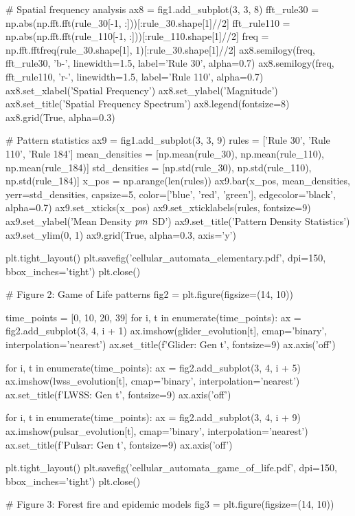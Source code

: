 \documentclass[a4paper, 11pt]{article}
\begin{document}
\begin{pycode}
# Spatial frequency analysis
ax8 = fig1.add_subplot(3, 3, 8)
fft_rule30 = np.abs(np.fft.fft(rule_30[-1, :]))[:rule_30.shape[1]//2]
fft_rule110 = np.abs(np.fft.fft(rule_110[-1, :]))[:rule_110.shape[1]//2]
freq = np.fft.fftfreq(rule_30.shape[1], 1)[:rule_30.shape[1]//2]
ax8.semilogy(freq, fft_rule30, 'b-', linewidth=1.5, label='Rule 30', alpha=0.7)
ax8.semilogy(freq, fft_rule110, 'r-', linewidth=1.5, label='Rule 110', alpha=0.7)
ax8.set_xlabel('Spatial Frequency')
ax8.set_ylabel('Magnitude')
ax8.set_title('Spatial Frequency Spectrum')
ax8.legend(fontsize=8)
ax8.grid(True, alpha=0.3)

# Pattern statistics
ax9 = fig1.add_subplot(3, 3, 9)
rules = ['Rule 30', 'Rule 110', 'Rule 184']
mean_densities = [np.mean(rule_30), np.mean(rule_110), np.mean(rule_184)]
std_densities = [np.std(rule_30), np.std(rule_110), np.std(rule_184)]
x_pos = np.arange(len(rules))
ax9.bar(x_pos, mean_densities, yerr=std_densities, capsize=5,
        color=['blue', 'red', 'green'], edgecolor='black', alpha=0.7)
ax9.set_xticks(x_pos)
ax9.set_xticklabels(rules, fontsize=9)
ax9.set_ylabel('Mean Density $\\pm$ SD')
ax9.set_title('Pattern Density Statistics')
ax9.set_ylim(0, 1)
ax9.grid(True, alpha=0.3, axis='y')

plt.tight_layout()
plt.savefig('cellular_automata_elementary.pdf', dpi=150, bbox_inches='tight')
plt.close()

# Figure 2: Game of Life patterns
fig2 = plt.figure(figsize=(14, 10))

time_points = [0, 10, 20, 39]
for i, t in enumerate(time_points):
    ax = fig2.add_subplot(3, 4, i + 1)
    ax.imshow(glider_evolution[t], cmap='binary', interpolation='nearest')
    ax.set_title(f'Glider: Gen {t}', fontsize=9)
    ax.axis('off')

for i, t in enumerate(time_points):
    ax = fig2.add_subplot(3, 4, i + 5)
    ax.imshow(lwss_evolution[t], cmap='binary', interpolation='nearest')
    ax.set_title(f'LWSS: Gen {t}', fontsize=9)
    ax.axis('off')

for i, t in enumerate(time_points):
    ax = fig2.add_subplot(3, 4, i + 9)
    ax.imshow(pulsar_evolution[t], cmap='binary', interpolation='nearest')
    ax.set_title(f'Pulsar: Gen {t}', fontsize=9)
    ax.axis('off')

plt.tight_layout()
plt.savefig('cellular_automata_game_of_life.pdf', dpi=150, bbox_inches='tight')
plt.close()

# Figure 3: Forest fire and epidemic models
fig3 = plt.figure(figsize=(14, 10))


\end{pycode}
\end{document}

